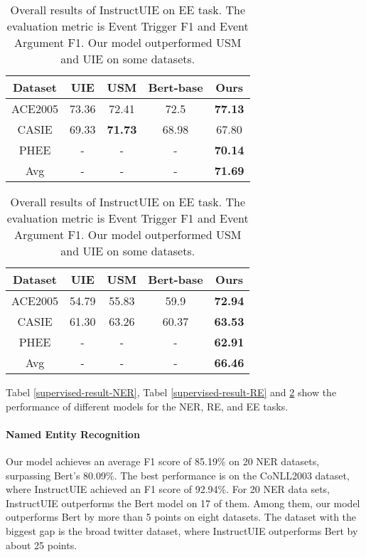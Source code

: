 \begin{table}[t]
    \centering
    \begin{subtable}
    \centering
    \begin{tabular}{c|ccc|c}
    \toprule  
    Dataset & UIE & USM & Bert-base & Ours \\
    \midrule
    ACE2005 & 73.36 & 72.41 & 72.5 & \textbf{77.13} \\
    CASIE & 69.33 & \textbf{71.73} & 68.98 & 67.80 \\
    PHEE & - & - & - & \textbf{70.14} \\
    Avg & - & - & - & \textbf{71.69} \\
    \bottomrule
    \end{tabular}
    \caption*{a. Event Trigger F1}
    \label{subtable1}
    \end{subtable}
    \hspace{0.1cm}
    \begin{subtable}
    \centering
    \begin{tabular}{c|ccc|c}
    \toprule  
    Dataset & UIE & USM & Bert-base & Ours \\
    \midrule
    ACE2005 & 54.79 & 55.83 & 59.9 & \textbf{72.94} \\
    CASIE & 61.30 & 63.26 & 60.37 & \textbf{63.53} \\
    PHEE & - & - & - & \textbf{62.91} \\
    Avg & - & - & - & \textbf{66.46} \\
    \bottomrule
    \end{tabular}
    \caption*{b. Event Argument F1}
    \label{subtable2}
    \end{subtable}
    \caption{Overall results of InstructUIE on EE task. The evaluation metric is Event Trigger F1 and Event Argument F1. Our model outperformed USM and UIE on some datasets.}
    \label{supervised-result-EE}
\end{table}

Tabel \ref{supervised-result-NER}, Tabel \ref{supervised-result-RE} and \ref{supervised-result-EE} show the performance of different models for the NER, RE, and EE tasks. 
\paragraph{Named Entity Recognition} 
Our model achieves an average F1 score of 85.19\% on 20 NER datasets, surpassing Bert's 80.09\%. The best performance is on the CoNLL2003 dataset, where InstructUIE achieved an F1 score of 92.94\%. For 20 NER data sets, InstructUIE outperforms the Bert model on 17 of them. Among them, our model outperforms Bert by more than 5 points on eight datasets. The dataset with the biggest gap is the broad twitter dataset, where InstructUIE outperforms Bert by about 25 points.

